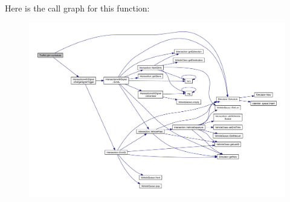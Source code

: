 Here is the call graph for this function\-:\nopagebreak
\begin{figure}[H]
\begin{center}
\leavevmode
\includegraphics[width=350pt]{class_traffic_light_a43310868b8badae122a037d85f009a0f_cgraph}
\end{center}
\end{figure}



